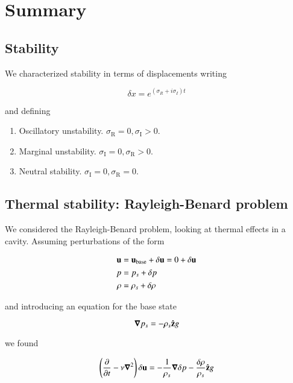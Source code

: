 \section{Summary}
\subsection{Stability}

We characterized stability in terms of displacements writing

\begin{equation}\label{eqn:continuumFluidsReview:2770}
\delta x = e^{(\sigma_R + i \sigma_I) t}
\end{equation}

and defining
\begin{enumerate}
\item Oscillatory unstability.  $\sigma_{\text{R}} = 0, \sigma_{\text{I}} > 0$.
\item Marginal unstability.  $\sigma_{\text{I}} = 0, \sigma_{\text{R}} > 0$.
\item Neutral stability.  $\sigma_{\text{I}} = 0, \sigma_{\text{R}} = 0$.
\end{enumerate}

\subsection{Thermal stability: Rayleigh-Benard problem}

We considered the Rayleigh-Benard problem, looking at thermal effects in a cavity.  Assuming perturbations of the form

\begin{align*}
\mathbf{u} &= \mathbf{u}_{\text{base}} + \delta \mathbf{u} = 0 + \delta \mathbf{u} \\
p &= p_s + \delta p \\
\rho &= \rho_s + \delta \rho
\end{align*}

and introducing an equation for the base state

\begin{equation}\label{eqn:continuumFluidsReview:2790}
\boldsymbol{\nabla} p_s = -\rho_s \hat{\mathbf{z}} g
\end{equation}

we found

\begin{equation}\label{eqn:continuumFluidsReview:2810}
\left( \frac{\partial {}}{\partial {t}} - \nu \boldsymbol{\nabla}^2 \right) \delta \mathbf{u} = -\frac{1}{\rho_s} \boldsymbol{\nabla} \delta p - \frac{\delta \rho}{\rho_s} \hat{\mathbf{z}} g
\end{equation}

